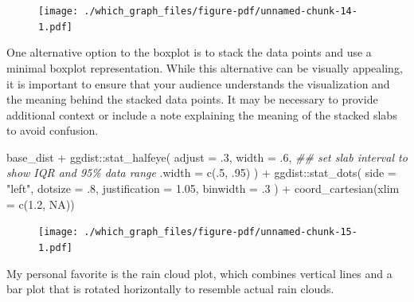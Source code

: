 \documentclass[
  letterpaper,
]{book}
\newenvironment{Shaded}{\begin{snugshade}}{\end{snugshade}}
\newcommand{\AttributeTok}[1]{\textcolor[rgb]{0.40,0.45,0.13}{#1}}
\newcommand{\ConstantTok}[1]{\textcolor[rgb]{0.56,0.35,0.01}{#1}}
\newcommand{\DecValTok}[1]{\textcolor[rgb]{0.68,0.00,0.00}{#1}}
\newcommand{\DocumentationTok}[1]{\textcolor[rgb]{0.37,0.37,0.37}{\textit{#1}}}
\newcommand{\FloatTok}[1]{\textcolor[rgb]{0.68,0.00,0.00}{#1}}
\newcommand{\FunctionTok}[1]{\textcolor[rgb]{0.28,0.35,0.67}{#1}}
\newcommand{\NormalTok}[1]{\textcolor[rgb]{0.00,0.23,0.31}{#1}}
\newcommand{\SpecialCharTok}[1]{\textcolor[rgb]{0.37,0.37,0.37}{#1}}
\newcommand{\StringTok}[1]{\textcolor[rgb]{0.13,0.47,0.30}{#1}}
\begin{document}
\begin{figure}[H]

{\centering \texttt{[image: ./which\_graph\_files/figure-pdf/unnamed-chunk-14-1.pdf]}

}

\end{figure}

One alternative option to the boxplot is to stack the data points and
use a minimal boxplot representation. While this alternative can be
visually appealing, it is important to ensure that your audience
understands the visualization and the meaning behind the stacked data
points. It may be necessary to provide additional context or include a
note explaining the meaning of the stacked slabs to avoid confusion.

\begin{Shaded}
\begin{Highlighting}[]
\NormalTok{base\_dist }\SpecialCharTok{+}
\NormalTok{  ggdist}\SpecialCharTok{::}\FunctionTok{stat\_halfeye}\NormalTok{(}
    \AttributeTok{adjust =}\NormalTok{ .}\DecValTok{3}\NormalTok{,}
    \AttributeTok{width =}\NormalTok{ .}\DecValTok{6}\NormalTok{, }
    \DocumentationTok{\#\# set slab interval to show IQR and 95\% data range}
    \AttributeTok{.width =} \FunctionTok{c}\NormalTok{(.}\DecValTok{5}\NormalTok{, .}\DecValTok{95}\NormalTok{)}
\NormalTok{  ) }\SpecialCharTok{+} 
\NormalTok{  ggdist}\SpecialCharTok{::}\FunctionTok{stat\_dots}\NormalTok{(}
    \AttributeTok{side =} \StringTok{"left"}\NormalTok{, }
    \AttributeTok{dotsize =}\NormalTok{ .}\DecValTok{8}\NormalTok{, }
    \AttributeTok{justification =} \FloatTok{1.05}\NormalTok{, }
    \AttributeTok{binwidth =}\NormalTok{ .}\DecValTok{3}
\NormalTok{  ) }\SpecialCharTok{+}
  \FunctionTok{coord\_cartesian}\NormalTok{(}\AttributeTok{xlim =} \FunctionTok{c}\NormalTok{(}\FloatTok{1.2}\NormalTok{, }\ConstantTok{NA}\NormalTok{)) }
\end{Highlighting}
\end{Shaded}

\begin{figure}[H]

{\centering \texttt{[image: ./which\_graph\_files/figure-pdf/unnamed-chunk-15-1.pdf]}

}

\end{figure}

My personal favorite is the rain cloud plot, which combines vertical
lines and a bar plot that is rotated horizontally to resemble actual
rain clouds.
\end{document}
